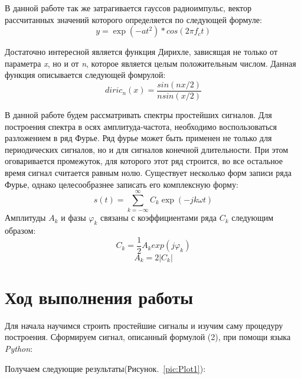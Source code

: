 В данной работе так же затрагивается гауссов радиоимпульс, вектор рассчитанных значений которого
определяется по следующей формуле:
\begin{equation} y = \exp(-a t^2) * cos(2\pi f_c t) \end{equation}

Достаточно интересной является функция Дирихле, зависящая не только от параметра \textit{x}, но и от \textit{n}, которое является целым положительным числом. Данная функция описывается следующей фомрулой:
\begin{equation} diric_n (x) = \frac{sin(n x/2)}{n sin(x/2)} \end{equation}

В данной работе будем рассматривать спектры простейших сигналов. Для построения спектра в осях амплитуда-частота, необходимо воспользоваться разложением в ряд Фурье. Ряд фурье может быть применен не только для периодических сигналов, но и для сигналов конечной длительности. При этом оговаривается промежуток, для которого этот ряд строится, во все остальное время сигнал считается равным нолю. Существует несколько форм записи ряда Фурье, однако целесообразнее записать его комплексную форму:
\begin{equation} s(t) = \sum\limits_{k=-\infty}^\infty C_k \exp(-jk\omega t) \end{equation}
Амплитуды $A_k$ и фазы $\varphi_k$ связаны с коэффициентами ряда $C_k$ следующим образом:
\begin{equation} C_k = \frac{1}{2}A_k exp(j \varphi_k) \end{equation}
\begin{equation} A_k = 2|C_k| \end{equation}
\section{Ход выполнения работы}
Для начала научимся строить простейшие сигналы и изучим саму процедуру построения. Сформируем сигнал, описанный формулой (2), при помощи языка \textit{Python}:


\parindent=1cm %

Получаем следующие результаты(Рисунок.~\ref{pic:Plot1}):

